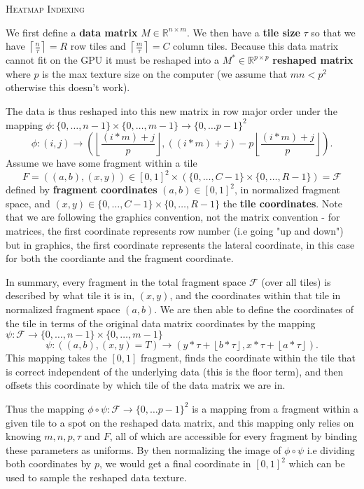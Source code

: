 \documentclass[a4paper]{article}
\newcommand{\Rr}{\mathbb{R}}
\begin{document}
	\begin{center}
		\Large{\textsc{Heatmap Indexing}}
	\end{center}

	We first define a \textbf{data matrix} $M \in \Rr^{n\times m}$.  We then have a \textbf{tile size} $\tau$ so that we have  $\left\lceil \frac{n}{\tau} \right\rceil = R$ row tiles and $\left\lceil \frac{m}{\tau} \right\rceil = C $ column tiles.  Because this data matrix cannot fit on the GPU it must be reshaped into a $M^{*} \in \Rr^{p \times p}$ \textbf{reshaped matrix} where $p$ is the max texture size on the computer (we assume that  $mn < p^{2}$ otherwise this doesn't work).  

	The data is thus reshaped into this new matrix in row major order under the mapping $\phi: \{0, \ldots, n - 1\} \times \{0, \ldots, m-1\}  \to \{0, \ldots p-1\}^{2}$ \[
	\phi:	(i, j) \to \left( \left\lfloor  \frac{\left( i * m \right) + j}{p}\right\rfloor, (\left( i * m \right) + j) - p \left\lfloor \frac{\left( i * m \right) + j}{p}\right\rfloor   \right) 
	.\] 
	Assume we have some fragment within a tile \[
		F = \left( \left( a, b \right), \left( x, y \right)   \right) \in [0,1]^{2} \times \left( \{0, \ldots, C - 1\} \times \{0, \ldots, R-1\}  \right) = \mathcal{F}
		\] defined by \textbf{fragment coordinates} $\left( a, b \right) \in [0,1]^{2}$, in normalized fragment space, and $\left( x,y \right) \in   \{0, \ldots, C - 1\} \times \{0, \ldots, R-1\}  $ the \textbf{tile coordinates}. Note that we are following the graphics convention, not the matrix convention - for matrices, the first coordinate represents row number (i.e going "up and down") but in graphics, the first coordinate represents the lateral coordinate, in this case for both the coordiante and the fragment coordinate.  

		In summary, every fragment in the total fragment space $\mathcal{F}$ (over all tiles) is described by what tile it is in, $\left( x, y \right) $, and the coordinates within that tile in normalized fragment space $(a,b)$. We are then able to define the coordinates of the tile in terms of the original data matrix coordinates by the mapping $\psi: \mathcal{F} \to \{0, \ldots, n - 1\} \times \{0, \ldots, m-1\}  $ \[
		\psi: (\left( a, b \right), \left( x, y \right) = T) \to \left( y * \tau + \left\lfloor b * \tau \right\rfloor, x * \tau + \left\lfloor a * \tau \right\rfloor \right)   
	.\]  
	This mapping takes the $[0,1]$ fragment, finds the coordinate within the tile that is correct independent of the underlying data (this is the floor term), and then offsets this coordinate by which tile of the data matrix we are in.

	Thus the mapping $\phi \circ \psi: \mathcal{F} \to \{0, \ldots p-1\}^{2} $ is a mapping from a fragment within a given tile to a spot on the reshaped data matrix, and this mapping only relies on knowing $m, n, p, \tau$ and  $F$, all of which are accessible for every fragment by binding these parameters as uniforms.  By then normalizing the image of $\phi \circ \psi$ i.e dividing both coordinates by  $p$, we would get a final coordinate  in $[0, 1]^{2}$ which can be used to sample the reshaped data texture.
\end{document}
